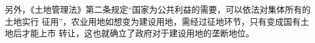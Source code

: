 另外，《土地管理法》第二条规定“国家为公共利益的需要，可以依法对集体所有的土地实行
征用”，农业用地如想变为建设用地，需经过征地环节，只有变成国有土地后才能上市
转让，这也就确立了政府对于建设用地的垄断地位。






